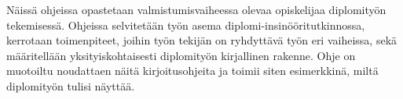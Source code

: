 Näissä ohjeissa opastetaan valmistumisvaiheessa olevaa opiskelijaa diplomityön tekemisessä. Ohjeissa selvitetään työn asema diplomi-insinööritutkinnossa, kerrotaan toimenpiteet, joihin työn tekijän on ryhdyttävä työn eri vaiheissa, sekä määritellään yksityiskohtaisesti diplomityön kirjallinen rakenne. Ohje on muotoiltu noudattaen näitä kirjoitusohjeita ja toimii siten esimerkkinä, miltä diplomityön tulisi näyttää.
